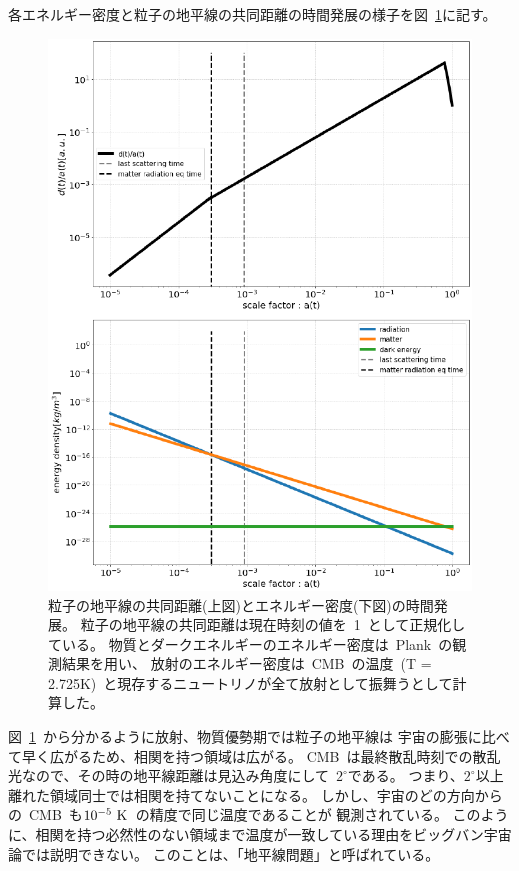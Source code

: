 各エネルギー密度と粒子の地平線の共同距離の時間発展の様子を図~\ref{scale_dev}に記す。
\begin{figure}[htbp]
  \centering
  \includegraphics[width=1\columnwidth]{2_cosmology/figs/scale_dev2.pdf}
  \caption{粒子の地平線の共同距離(上図)とエネルギー密度(下図)の時間発展。
  粒子の地平線の共同距離は現在時刻の値を~1~として正規化している。
  物質とダークエネルギーのエネルギー密度は~Plank~の観測結果\cite{plank}を用い、
  放射のエネルギー密度は~CMB~の温度~(T = 2.725K)~と現存するニュートリノが全て放射として振舞うとして計算した。}
  \label{scale_dev}
\end{figure}
図~\ref{scale_dev}~から分かるように放射、物質優勢期では粒子の地平線は
宇宙の膨張に比べて早く広がるため、相関を持つ領域は広がる。
CMB~は最終散乱時刻での散乱光なので、その時の地平線距離は見込み角度にして~$2^{\circ}$である。
つまり、$2^{\circ}$以上離れた領域同士では相関を持てないことになる。
しかし、宇宙のどの方向からの~CMB~も$10^{-5}~{\rm K}$~の精度で同じ温度であることが
観測されている。
このように、相関を持つ必然性のない領域まで温度が一致している理由をビッグバン宇宙論では説明できない。
このことは、「地平線問題」と呼ばれている。


